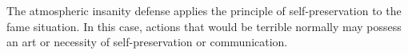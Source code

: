 

The atmospheric insanity defense applies the principle of
self-preservation to the fame situation.  In this case, actions that
would be terrible normally may possess an art or necessity of
self-preservation or communication.

\bye
